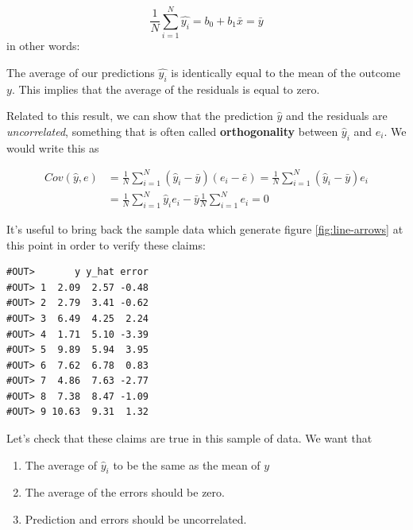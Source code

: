 \documentclass[]{book}
\newenvironment{Shaded}{\begin{snugshade}}{\end{snugshade}}
\newcommand{\KeywordTok}[1]{\textcolor[rgb]{0.13,0.29,0.53}{\textbf{#1}}}
\newcommand{\DecValTok}[1]{\textcolor[rgb]{0.00,0.00,0.81}{#1}}
\newcommand{\CommentTok}[1]{\textcolor[rgb]{0.56,0.35,0.01}{\textit{#1}}}
\newcommand{\OperatorTok}[1]{\textcolor[rgb]{0.81,0.36,0.00}{\textbf{#1}}}
\newcommand{\NormalTok}[1]{#1}
\providecommand{\tightlist}{%
  \setlength{\itemsep}{0pt}\setlength{\parskip}{0pt}}
\newenvironment{tip}{\begin{tcolorbox}[colback=green!5!white,colframe=green,title=\textbf{Tip:}]}{\end{tcolorbox}}
\theoremstyle{definition}
\theoremstyle{definition}
\theoremstyle{definition}
\theoremstyle{remark}
\begin{document}
\[
\frac{1}{N} \sum_{i=1}^N \hat{y_i}  = b_0 + b_1  \bar{x} = \bar{y}
\] in other words:

\begin{tip}
The average of our predictions \(\hat{y_i}\) is identically equal to the
mean of the outcome \(y\). This implies that the average of the
residuals is equal to zero.
\end{tip}

 Related to this result, we can show that the prediction \(\hat{y}\) and
the residuals are \emph{uncorrelated}, something that is often called
\textbf{orthogonality} between \(\hat{y}_i\) and \(e_i\). We would write
this as

\begin{align}
Cov(\hat{y},e) &=\frac{1}{N} \sum_{i=1}^N (\hat{y}_i-\bar{y})(e_i-\bar{e}) =   \frac{1}{N} \sum_{i=1}^N (\hat{y}_i-\bar{y})e_i \\
&=  \frac{1}{N} \sum_{i=1}^N \hat{y}_i e_i-\bar{y} \frac{1}{N} \sum_{i=1}^N e_i = 0
\end{align}

It's useful to bring back the sample data which generate figure
\ref{fig:line-arrows} at this point in order to verify these claims:

\begin{verbatim}
#OUT>       y y_hat error
#OUT> 1  2.09  2.57 -0.48
#OUT> 2  2.79  3.41 -0.62
#OUT> 3  6.49  4.25  2.24
#OUT> 4  1.71  5.10 -3.39
#OUT> 5  9.89  5.94  3.95
#OUT> 6  7.62  6.78  0.83
#OUT> 7  4.86  7.63 -2.77
#OUT> 8  7.38  8.47 -1.09
#OUT> 9 10.63  9.31  1.32
\end{verbatim}

Let's check that these claims are true in this sample of data. We want
that

\begin{enumerate}
\def\labelenumi{\arabic{enumi}.}
\tightlist
\item
  The average of \(\hat{y}_i\) to be the same as the mean of \(y\)
\item
  The average of the errors should be zero.
\item
  Prediction and errors should be uncorrelated.
\end{enumerate}

\begin{Shaded}
\end{Shaded}
\end{document}
